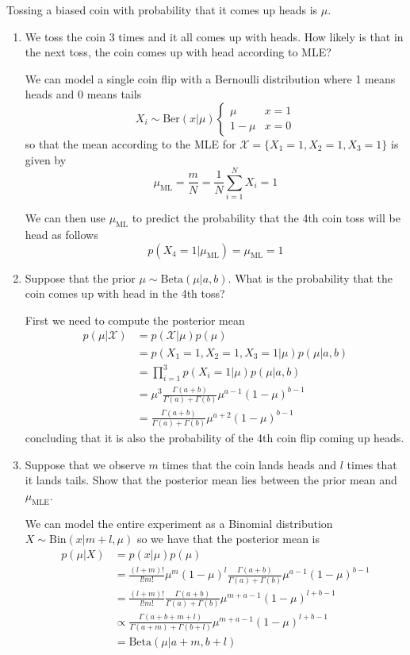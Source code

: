 \documentclass{amsmlaj}
\begin{document}
\begin{problem}
Tossing a biased coin with probability that it comes up heads is $\mu$. 
\begin{enumerate}
\item We toss the coin 3 times and it all comes up with heads.
				How likely is that in the next toss, the coin comes up
				with head according to MLE?

	We can model a single coin flip with a Bernoulli distribution where 1 means
	heads and 0 means tails
	$$X_i \sim \text{Ber}(x|\mu)\begin{cases}\mu & x=1 \\ 1-\mu & x=0\end{cases}$$
	so that the mean according to the MLE for $\mathcal{X}=\{X_1=1,X_2=1,X_3=1\}$ is given by
	$$\mu_\text{ML}=\frac{m}{N}=\frac{1}{N}\sum_{i=1}^N X_i=1$$

	We can then use $\mu_\text{ML}$ to predict the probability that the
	4th coin toss will be head as follows
	$$p(X_4=1|\mu_\text{ML})=\mu_\text{ML}=1$$

\item Suppose that the prior $\mu \sim \text{Beta}(\mu|a,b)$.
				What is the probability  that the coin comes up with
				head in the 4th toss?

	First we need to compute the posterior mean
	\begin{equation}
		\begin{split}
			p(\mu|\mathcal{X})&=p(\mathcal{X}|\mu)p(\mu) \\
			&=p(X_1=1,X_2=1,X_3=1|\mu)p(\mu|a,b) \\
			&=\prod_{i=1}^3p(X_i=1|\mu)p(\mu|a,b) \\
			&=\mu^3\frac{\Gamma(a+b)}{\Gamma(a)+\Gamma(b)}\mu^{a-1}(1-\mu)^{b-1} \\
			&=\frac{\Gamma(a+b)}{\Gamma(a)+\Gamma(b)}\mu^{a+2}(1-\mu)^{b-1}
		\end{split}
	\end{equation}
	concluding that it is also the probability of the 4th coin flip coming up
	heads.

\item Suppose that we observe $m$ times that the coin lands
				heads and $l$ times that it lands tails. Show that the
				posterior mean lies between the prior mean and
				$\mu_{\text{MLE}}$.

	We can model the entire experiment as a Binomial distribution
	$X \sim \text{Bin}(x|m+l,\mu)$ so we have that the posterior mean is
	\begin{equation}
		\begin{split}
			p(\mu|X)&=p(x|\mu)p(\mu) \\
			&=\frac{(l+m)!}{l!m!}\mu^m(1-\mu)^l\frac{\Gamma(a+b)}{\Gamma(a)+\Gamma(b)}\mu^{a-1}(1-\mu)^{b-1} \\
			&=\frac{(l+m)!}{l!m!}\frac{\Gamma(a+b)}{\Gamma(a)+\Gamma(b)}\mu^{m+a-1}(1-\mu)^{l+b-1} \\
			&\propto
			\frac{\Gamma(a+b+m+l)}{\Gamma(a+m)+\Gamma(b+l)}\mu^{m+a-1}(1-\mu)^{l+b-1} \\
			&=\text{Beta}(\mu|a+m,b+l)
		\end{split}
	\end{equation}


\end{enumerate}
\end{problem}
\end{document}
